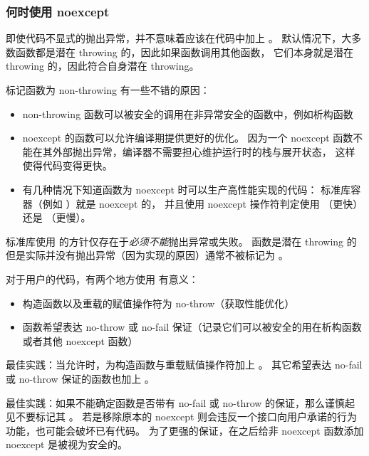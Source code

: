 \documentclass[../../LearnCpp.tex]{subfiles}
\begin{document}
\subsubsection*{何时使用 noexcept}

即使代码不显式的抛出异常，并不意味着应该在代码中加上 。
默认情况下，大多数函数都是潜在 throwing 的，因此如果函数调用其他函数，
它们本身就是潜在 throwing 的，因此符合自身潜在 throwing。

标记函数为 non-throwing 有一些不错的原因：

\begin{itemize}
  \item non-throwing 函数可以被安全的调用在非异常安全的函数中，例如析构函数
  \item noexcept 的函数可以允许编译期提供更好的优化。
        因为一个 noexcept 函数不能在其外部抛出异常，编译器不需要担心维护运行时的栈与展开状态，
        这样使得代码变得更快。
  \item 有几种情况下知道函数为 noexcept 时可以生产高性能实现的代码：
        标准库容器（例如 ）就是 noexcept 的，
        并且使用 noexcept 操作符判定使用 （更快）还是 （更慢）。
\end{itemize}

标准库使用  的方针仅存在于\textit{必须不能}抛出异常或失败。
函数是潜在 throwing 的但是实际并没有抛出异常（因为实现的原因）通常不被标记为 。

对于用户的代码，有两个地方使用  有意义：

\begin{itemize}
  \item 构造函数以及重载的赋值操作符为 no-throw（获取性能优化）
  \item 函数希望表达 no-throw 或 no-fail 保证（记录它们可以被安全的用在析构函数或者其他 noexcept 函数）
\end{itemize}

最佳实践：当允许时，为构造函数与重载赋值操作符加上 。
其它希望表达 no-fail 或 no-throw 保证的函数也加上 。

最佳实践：如果不能确定函数是否带有 no-fail 或 no-throw 的保证，那么谨慎起见不要标记其 。
若是移除原本的 noexcept 则会违反一个接口向用户承诺的行为功能，也可能会破坏已有代码。
为了更强的保证，在之后给非 noexcept 函数添加 noexcept 是被视为安全的。
\end{document}
